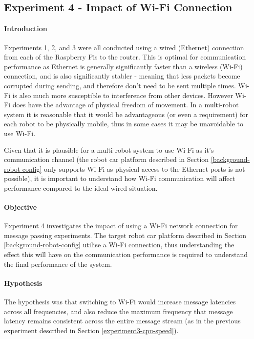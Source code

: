 \documentclass[../dissertation.tex]{subfiles}
\begin{document}
\subsection{Experiment 4 - Impact of Wi-Fi Connection}
\label{exp-4}

\paragraph{Introduction} Experiments 1, 2, and 3 were all conducted using a wired (Ethernet) connection from each of the Raspberry Pis to the router. This is optimal for communication performance as Ethernet is generally significantly faster than a wireless (Wi-Fi) connection, and is also significantly stabler - meaning that less packets become corrupted during sending, and therefore don't need to be sent multiple times. Wi-Fi is also much more susceptible to interference from other devices. However Wi-Fi does have the advantage of physical freedom of movement. In a multi-robot system it is reasonable that it would be advantageous (or even a requirement) for each robot to be physically mobile, thus in some cases it may be unavoidable to use Wi-Fi.

Given that it is plausible for a multi-robot system to use Wi-Fi as it's communication channel (the robot car platform described in Section \ref{background-robot-config} only supports Wi-Fi as physical access to the Ethernet ports is not possible), it is important to understand how Wi-Fi communication will affect performance compared to the ideal wired situation.

\paragraph{Objective} Experiment 4 investigates the impact of using a Wi-Fi network connection for message passing experiments. The target robot car platform described in Section \ref{background-robot-config} utilise a Wi-Fi connection, thus understanding the effect this will have on the communication performance is required to understand the final performance of the system.

\paragraph{Hypothesis} The hypothesis was that switching to Wi-Fi would increase message latencies across all frequencies, and also reduce the maximum frequency that message latency remains consistent across the entire message stream (as in the previous experiment described in Section \ref{experiment3-cpu-speed}).
\end{document}
